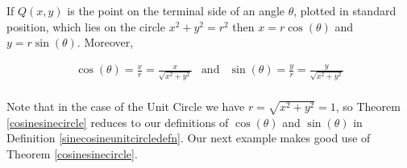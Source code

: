 \documentclass{ximera}
\begin{document}
\begin{theorem}  \label{cosinesinecircle} If $Q(x,y)$ is the point on the terminal side of an angle $\theta$, plotted in standard position, which lies on the circle $x^2+y^2 = r^2$ then $x = r \cos(\theta)$ and $y = r \sin(\theta)$.  Moreover,  

\[\begin{array}{ccc} \cos(\theta)= \frac{x}{r}  = \frac{x}{\sqrt{x^2+y^2}} & \text{and} &  \sin(\theta) = \frac{y}{r} = \frac{y}{\sqrt{x^2+y^2}} \\ \end{array} \]

\end{theorem}


Note that in the case of the Unit Circle we have $r = \sqrt{x^2+y^2} = 1$, so Theorem \ref{cosinesinecircle} reduces to our definitions of $\cos(\theta)$ and $\sin(\theta)$ in Definition \ref{sinecosineunitcircledefn}. Our next example makes good use of Theorem \ref{cosinesinecircle}.  
\end{document}
